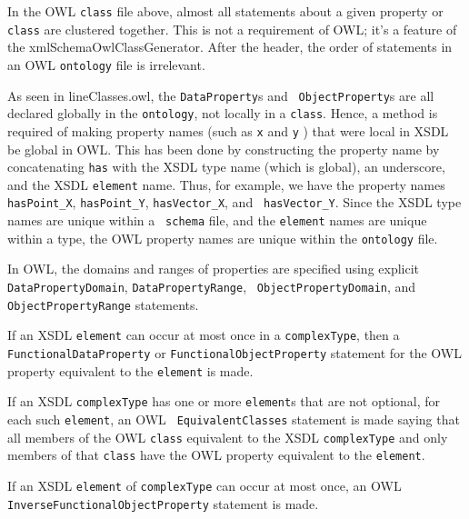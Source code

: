 \documentclass[preprint,12pt]{elsarticle}
\begin{document}
In the OWL {\tt class} file above, almost all statements about a given
property or {\tt class} are clustered together. This is not a requirement
of OWL; it's a feature of the xmlSchemaOwlClassGenerator. After the header,
the order of statements in an OWL {\tt ontology} file is irrelevant.

As seen in lineClasses.owl, the {\tt DataProperty}s and {\tt
  ObjectProperty}s are all declared globally in the {\tt ontology}, not
locally in a {\tt class}. Hence, a method is required of making property
names (such as {\tt x} and {\tt y} ) that were local in XSDL be global in
OWL. This has been done by constructing the property name by concatenating
{\tt has} with the XSDL type name (which is global), an underscore, and the
XSDL {\tt element} name. Thus, for example, we have the property names {\tt
  hasPoint\_X}, {\tt hasPoint\_Y}, {\tt hasVector\_X}, and {\tt
  hasVector\_Y}. Since the XSDL type names are unique within a {\tt
  schema} file, and the {\tt element} names are unique within a type, the
OWL property names are unique within the {\tt ontology} file.

In OWL, the domains and ranges of properties are specified using explicit
{\tt DataPropertyDomain}, {\tt DataPropertyRange}, {\tt
  ObjectPropertyDomain}, and {\tt ObjectPropertyRange} statements.

If an XSDL {\tt element} can occur at most once in a {\tt complexType},
then a {\tt FunctionalDataProperty} or {\tt FunctionalObjectProperty}
statement for the OWL property equivalent to the {\tt element} is made.

If an XSDL {\tt complexType} has one or more {\tt element}s that are not
optional, for each such {\tt element}, an OWL {\tt
  EquivalentClasses} statement is made saying that all members of the OWL
{\tt class} equivalent to the XSDL {\tt complexType} and only members of
that {\tt class} have the OWL property equivalent to the {\tt element}.

If an XSDL {\tt element} of {\tt complexType} can occur at most once, an
OWL {\tt InverseFunctionalObjectProperty} statement is made.
\end{document}
